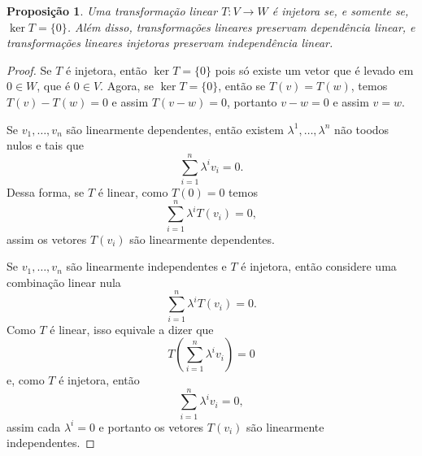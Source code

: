\documentclass{article}
\newtheorem{proposition}[definition]{Proposição}
\begin{document}
\begin{proposition}
    Uma transformação linear $T \colon V \to W$ é injetora se, e somente se, $\ker T = \{0\}$. Além disso, transformações lineares preservam dependência linear, e transformações lineares injetoras preservam independência linear.
\end{proposition}
\begin{proof}
    Se $T$ é injetora, então $\ker T = \{0\}$ pois só existe um vetor que é levado em $0 \in W$, que é $0 \in V$. Agora, se $\ker T = \{0\}$, então se $T(v) = T(w)$, temos $T(v) - T(w) = 0$ e assim $T(v - w) = 0$, portanto $v - w = 0$ e assim $v = w$.

    Se $v_1, \dots, v_n$ são linearmente dependentes, então existem $\lambda^1, \dots, \lambda^n$ não toodos nulos e tais que \begin{equation}
        \sum_{i = 1}^{n} \lambda^i v_i = 0.
    \end{equation} Dessa forma, se $T$ é linear, como $T(0) = 0$ temos \begin{equation}
        \sum_{i = 1}^{n} \lambda^i T(v_i) = 0,
    \end{equation} assim os vetores $T(v_i)$ são linearmente dependentes.

    Se $v_1, \dots, v_n$ são linearmente independentes e $T$ é injetora, então considere uma combinação linear nula \begin{equation}
        \sum_{i = 1}^n \lambda^i T(v_i) = 0.
    \end{equation} Como $T$ é linear, isso equivale a dizer que \begin{equation}
        T\left(\sum_{i = 1}^n \lambda^i v_i\right) = 0
    \end{equation} e, como $T$ é injetora, então \begin{equation}
        \sum_{i = 1}^{n} \lambda^i v_i = 0,
    \end{equation} assim cada $\lambda^i = 0$ e portanto os vetores $T(v_i)$ são linearmente independentes.
\end{proof}
\end{document}
